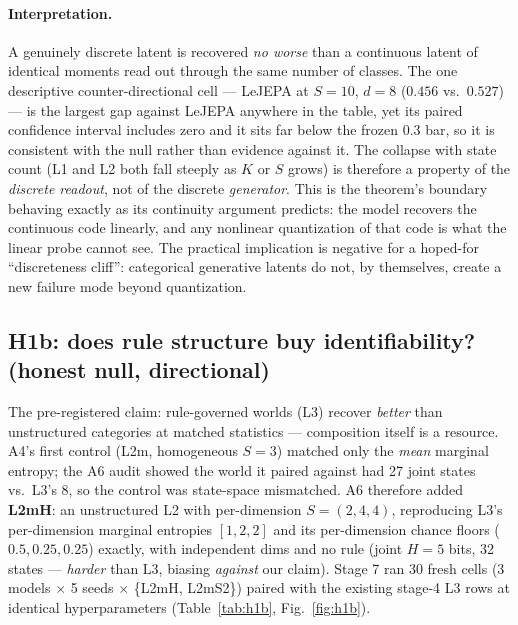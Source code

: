 \documentclass[11pt]{article}
\begin{document}
\paragraph{Interpretation.}
A genuinely discrete latent is recovered \emph{no worse} than a continuous
latent of identical moments read out through the same number of classes. The
one descriptive counter-directional cell --- LeJEPA at $S{=}10$, $d{=}8$
($0.456$ vs.\ $0.527$) --- is the largest gap against LeJEPA anywhere in the
table, yet its paired confidence interval includes zero and it sits far below
the frozen $0.3$ bar, so it is consistent with the null rather than evidence
against it. The
collapse with state count (L1 and L2 both fall steeply as $K$ or $S$ grows) is
therefore a property of the \emph{discrete readout}, not of the discrete
\emph{generator}. This is the theorem's boundary behaving exactly as its
continuity argument predicts: the model recovers the continuous code linearly,
and any nonlinear quantization of that code is what the linear probe cannot
see. The practical implication is negative for a hoped-for ``discreteness
cliff'': categorical generative latents do not, by themselves, create a new
failure mode beyond quantization.

\subsection{H1b: does rule structure buy identifiability? (honest null, directional)}
\label{sec:h1b}
The pre-registered claim: rule-governed worlds (L3) recover \emph{better} than
unstructured categories at matched statistics --- composition itself is a
resource. A4's first control (L2m, homogeneous $S{=}3$) matched only the
\emph{mean} marginal entropy; the A6 audit showed the world it paired against
had 27 joint states vs.\ L3's 8, so the control was state-space mismatched. A6
therefore added \textbf{L2mH}: an unstructured L2 with per-dimension
$S{=}(2,4,4)$, reproducing L3's per-dimension marginal entropies
$[1,2,2]$ and its per-dimension chance floors ($0.5,0.25,0.25$) exactly, with
independent dims and no rule (joint $H{=}5$ bits, 32 states --- \emph{harder}
than L3, biasing \emph{against} our claim). Stage 7 ran 30 fresh cells
(3 models $\times$ 5 seeds $\times$ \{L2mH, L2mS2\}) paired with the existing
stage-4 L3 rows at identical hyperparameters (Table~\ref{tab:h1b},
Fig.~\ref{fig:h1b}).
\end{document}
